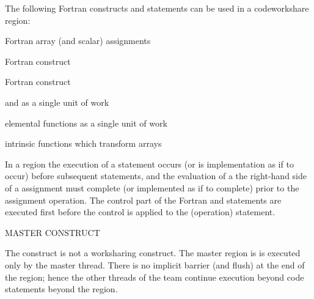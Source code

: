 The following Fortran constructs and statements can be used in a code{workshare} region:

\begin{compactitem}
\item Fortran array (and scalar) assignments
\item Fortran  construct
\item Fortran  construct
\item {} and  as a single unit of work
\item elemental functions as a single unit of work
\item intrinsic functions which transform arrays
\end{compactitem}


In a  region the execution of a statement occurs 
(or is implementation as if to occur) before subsequent statements, and the evaluation 
of a the right-hand side of a assignment must complete 
(or implemented as if to complete) prior to the assignment operation.
The control part of the Fortran  and 
 statements are executed first before the control is applied 
to the (operation) statement.

MASTER CONSTRUCT

The  construct is not a worksharing construct.  The master region is
is executed only by the master thread. There is no implicit barrier (and flush) 
at the end of the  region; hence the other threads of the team continue
execution beyond code statements beyond the  region.
